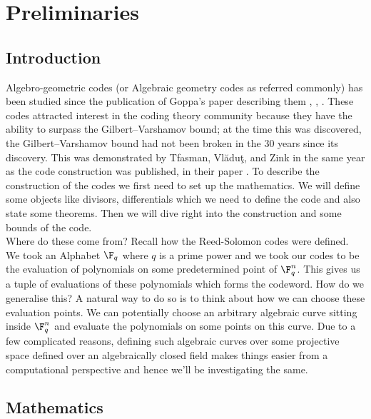 \chapter{Preliminaries}
\section{Introduction}
Algebro-geometric codes (or Algebraic geometry codes as referred commonly) has been studied since the publication of Goppa's paper describing them \cite{goppafirst}, \cite{Goppa1981CodesOA}, \cite{Goppa1984CodesAI}. These codes attracted interest in the coding theory community because they have the ability to surpass the Gilbert–Varshamov bound; at the time this was discovered, the Gilbert–Varshamov bound had not been broken in the 30 years since its discovery. This was demonstrated by Tfasman, Vl\u{a}du\c{t}, and Zink in the same year as the code construction was published, in their paper  \cite{tvzbound}. To describe the construction of the codes we first need to set up the mathematics. We will define some objects like divisors, differentials which we need to define the code and also state some theorems. Then we will dive right into the construction and some bounds of the code.\\

Where do these come from? Recall how the Reed-Solomon codes were defined. We took an Alphabet $\F_q$ where $q$ is a prime power and we took our codes to be the evaluation of polynomials on some predetermined point of $\F_q^n$. This gives us a tuple of evaluations of these polynomials which forms the codeword. How do we generalise this? A natural way to do so is to think about how we can choose these evaluation points. We can potentially choose an arbitrary algebraic curve sitting inside $\F_q^n$ and evaluate the polynomials on some points on this curve. Due to a few complicated reasons, defining such algebraic curves over some projective space defined over an algebraically closed field makes things easier from a computational perspective and hence we'll be investigating the same.
\section{Mathematics}
